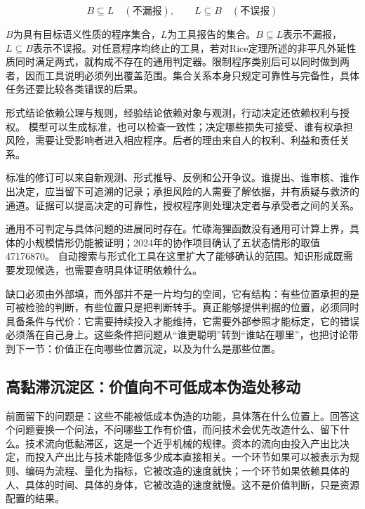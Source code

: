 \begin{equation}
B\subseteq L\quad(\text{不漏报}),\qquad L\subseteq B\quad(\text{不误报})
\end{equation}

$B$为具有目标语义性质的程序集合，$L$为工具报告的集合。$B\subseteq L$表示不漏报，$L\subseteq B$表示不误报。对任意程序均终止的工具，若对Rice定理所述的非平凡外延性质同时满足两式，就构成不存在的通用判定器。限制程序类别后可以同时做到两者，因而工具说明必须列出覆盖范围。集合关系本身只规定可靠性与完备性，具体任务还要比较各类错误的后果。


形式结论依赖公理与规则，经验结论依赖对象与观测，行动决定还依赖权利与授权。 模型可以生成标准，也可以检查一致性；决定哪些损失可接受、谁有权承担风险，需要让受影响者进入相应程序。后者的理由来自人的权利、利益和责任关系。


标准的修订可以来自新观测、形式推导、反例和公开争议。谁提出、谁审核、谁作出决定，应当留下可追溯的记录；承担风险的人需要了解依据，并有质疑与救济的通道。证据可以提高决定的可靠性，授权程序则处理决定者与承受者之间的关系。

通用不可判定与具体问题的进展同时存在。忙碌海狸函数没有通用可计算上界，具体的小规模情形仍能被证明；2024年的协作项目确认了五状态情形的取值47176870。\cite{bbchallenge2024} 自动搜索与形式化工具在这里扩大了能够确认的范围。知识形成既需要发现候选，也需要查明具体证明依赖什么。

缺口必须由外部填，而外部并不是一片均匀的空间，它有结构：有些位置承担的是可被检验的判断，有些位置只是把判断转手。真正能够提供判据的位置，必须同时具备条件与代价：它需要持续投入才能维持，它需要外部参照才能标定，它的错误必须落在自己身上。这些条件把问题从“谁更聪明”转到“谁站在哪里”，也把讨论带到下一节：价值正在向哪些位置沉淀，以及为什么是那些位置。

\subsection{高黏滞沉淀区：价值向不可低成本伪造处移动}


前面留下的问题是：这些不能被低成本伪造的功能，具体落在什么位置上。回答这个问题要换一个问法，不问哪些工作有价值，而问技术会优先改造什么、留下什么。技术流向低黏滞区，这是一个近乎机械的规律。资本的流向由投入产出比决定，而投入产出比与技术能降低多少成本直接相关。一个环节如果可以被表示为规则、编码为流程、量化为指标，它被改造的速度就快；一个环节如果依赖具体的人、具体的时间、具体的身体，它被改造的速度就慢。这不是价值判断，只是资源配置的结果。

